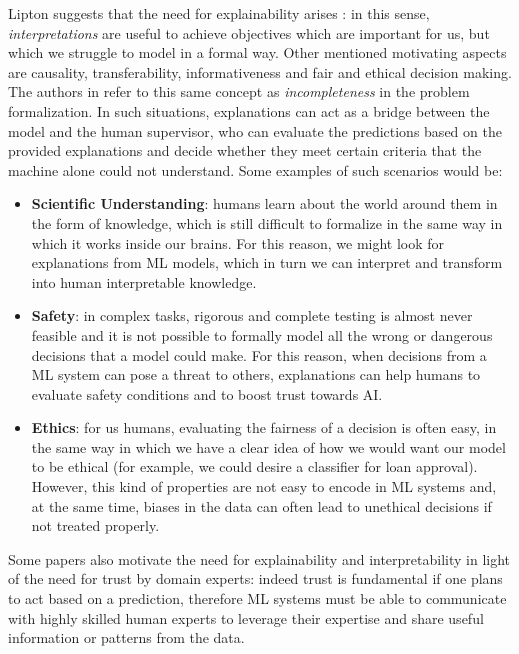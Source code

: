 Lipton \cite{lipton2017mythos} suggests that the need for explainability arises : in this sense, \textit{interpretations} are useful to achieve objectives which are important for us, but which we struggle to model in a formal way. Other mentioned motivating aspects are causality, transferability, informativeness and fair and ethical decision making.
The authors in \cite{doshivelez2017rigorous} refer to this same concept as \textit{incompleteness} in the problem formalization. In such situations, explanations can act as a bridge between the model and the human  supervisor, who can evaluate the predictions based on the provided explanations and decide whether they meet certain criteria that the machine alone could not understand.
 Some examples of such scenarios would be:
\begin{itemize}
	\item \textbf{Scientific Understanding}: humans learn about the world around them in the form of knowledge, which is still difficult to formalize in the same way in which it works inside our brains. For this reason, we might look for explanations from ML models, which in turn we can interpret and transform into human interpretable knowledge.
	\item \textbf{Safety}: in complex tasks, rigorous and complete testing is almost never feasible and it is not possible to formally model all the wrong or dangerous decisions that a model could make. For this reason, when decisions from a ML system can pose a threat to others, explanations can help humans to evaluate safety conditions and to boost trust towards AI.
	\item \textbf{Ethics}: for us humans, evaluating the fairness of a decision is often easy, in the same way in which we have a clear idea of how we would want our model to be ethical (for example, we could desire a  classifier for loan approval). However, this kind of properties are not easy to encode in ML systems and, at the same time, biases in the data can often lead to unethical decisions if not treated properly. 
\end{itemize}

Some papers \cite{Kim2015InteractiveAI, ribeiro2016trust} also motivate the need for explainability and interpretability in light of the need for trust by domain experts: indeed trust is fundamental if one plans to act based on a prediction, therefore ML systems must be able to communicate with highly skilled human experts to leverage their expertise and share useful information or patterns from the data. 

